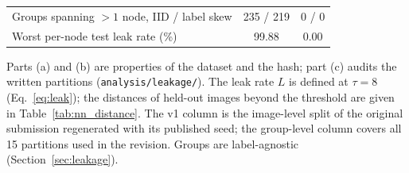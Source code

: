 \documentclass[journal]{IEEEtran}
\begin{document}
\begin{table}[t]
{\begin{tabular}{@{}lcc@{}}
Groups spanning $>1$ node, IID / label skew & 235 / 219 & 0 / 0 \\
Worst per-node test leak rate (\%) & 99.88 & 0.00 \\
\bottomrule
\end{tabular}}
\vspace{2pt}
\footnotesize{Parts (a) and (b) are properties of the dataset and the hash; part (c) audits the written partitions (\texttt{analysis/leakage/}). The leak rate $L$ is defined at $\tau=8$ (Eq.~\eqref{eq:leak}); the distances of held-out images beyond the threshold are given in Table~\ref{tab:nn_distance}. The v1 column is the image-level split of the original submission regenerated with its published seed; the group-level column covers all 15 partitions used in the revision. Groups are label-agnostic (Section~\ref{sec:leakage}).}
\end{table}



\end{document}
